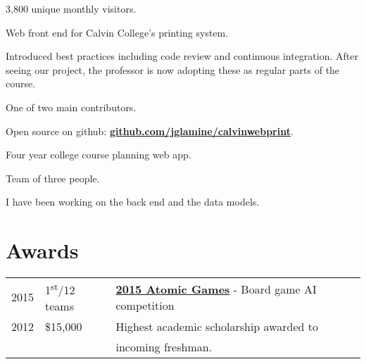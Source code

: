 \documentclass[letterpaper]{deedy-resume} %
\begin{document}
\begin{minipage}[t]{0.66\textwidth}
\begin{tightitemize}
\item 3,800 unique monthly visitors.
\item Web front end for Calvin College's printing system.
\item Introduced best practices including code review and continuous integration. After seeing our project, the professor is now adopting these as regular parts of the course.
\item One of two main contributors.
\item Open source on github: \textbf{\href{https://github.com/jglamine/calvinwebprint}{github.com/jglamine/calvinwebprint}}.
\end{tightitemize}

\sectionspace %



\begin{tightitemize}
\item Four year college course planning web app.
\item Team of three people.
\item I have been working on the back end and the data models.
\end{tightitemize}


\sectionspace %


\section{Awards} 

\begin{tabular}{rll}
2015	 & 1\textsuperscript{st}/12 teams & \textbf{\href{http://spin.atomicobject.com/2015/11/04/atomic-games-2015/}{2015 Atomic Games}} - Board game AI competition \\
2012	 & \$15,000 & Highest academic scholarship awarded to \\
         & & incoming freshman.
\end{tabular}

\sectionspace %



\end{minipage} %
\end{document}
